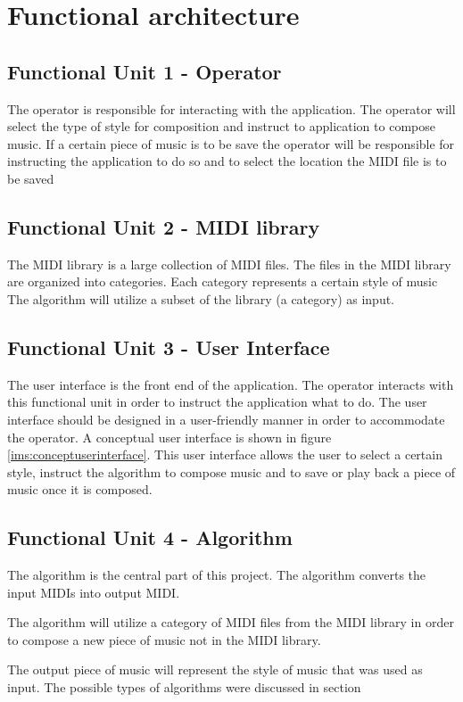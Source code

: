 \section{Functional architecture}
\subsection{Functional Unit 1 - Operator}
The operator is responsible for interacting with the application. The operator will select the type of style for composition and instruct to application to compose music.
If a certain piece of music is to be save the operator will be responsible for instructing the application to do so and to select the location the \ac{MIDI} file is to be saved

\subsection{Functional Unit 2 - MIDI library }
The MIDI library is a large collection of \ac{MIDI} files. The files in the \ac{MIDI} library are organized into categories. Each category represents a certain style of music
The algorithm will utilize a subset of the library (a category) as input.

\subsection{Functional Unit 3 - User Interface}
The user interface is the front end of the application. The operator interacts with this functional unit in order to instruct the application what to do.
The user interface should be designed in a user-friendly manner in order to accommodate the operator.
A conceptual user interface is shown in figure \ref{ims:conceptuserinterface}. This user interface allows the user to select a certain style, instruct the algorithm to compose music and to save or play back a piece of music once it is composed.

\subsection{Functional Unit 4 - Algorithm}
The algorithm is the central part of this project. The algorithm converts the input \acp{MIDI} into output \ac{MIDI}.

The algorithm will utilize a category of \ac{MIDI} files from the \ac{MIDI} library in order to compose a new piece of music not in the \ac{MIDI} library.

The output piece of music will represent the style of music that was used as input.
The possible types of algorithms were discussed in section \label{chap:comp_algo}


